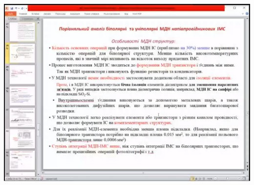 \documentclass[a4paper,14pt]{extreport}
\begin{document}
\begin{center}
\includegraphics[scale = 0.75]{13.png}
\end{center}
\end{document}
